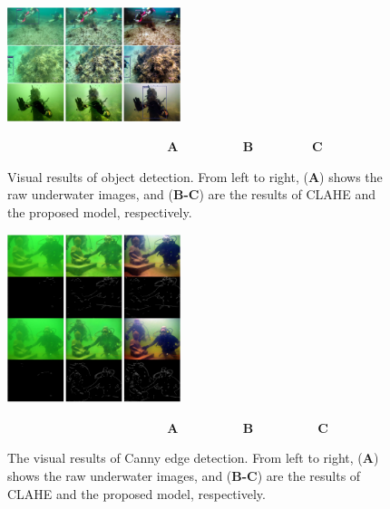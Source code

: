 \documentclass[utf8]{FrontiersinHarvard} %
\begin{document}
\begin{figure}[htbp]
\begin{center}
\includegraphics[width=0.45\textwidth]{FSpiralGAN_frontiers/onepicture/object_detection300.jpg}
\end{center}
$~~~~~~~~~~~~~~~~~~~~~~~~~~~~~~~~~~~~~~~~~~~~~~~~~~~~~~~~~$\textbf{A}$~~~~~~~~~~~~~~~~~~~~~~~$\textbf{B}$~~~~~~~~~~~~~~~~~~~~~$\textbf{C}
 \caption{Visual results of object detection. From left to right, (\textbf{A}) shows the raw underwater images, and (\textbf{B-C}) are the results of CLAHE and the proposed model, respectively. \label{fig:comparison-object detection}}
\end{figure}

\begin{figure}[htbp]
\begin{center}
\includegraphics[width=0.45\textwidth]{FSpiralGAN_frontiers/onepicture/canny300.jpg}
\end{center}
$~~~~~~~~~~~~~~~~~~~~~~~~~~~~~~~~~~~~~~~~~~~~~~~~~~~~~~~~~$\textbf{A}$~~~~~~~~~~~~~~~~~~~~~~~$\textbf{B}$~~~~~~~~~~~~~~~~~~~~~~~$\textbf{C}
 \caption{The visual results of Canny edge detection. From left to right, (\textbf{A}) shows the raw underwater images, and (\textbf{B-C}) are the results of CLAHE and the proposed model, respectively. \label{fig:comparison-canny}}
\end{figure}
\end{document}
